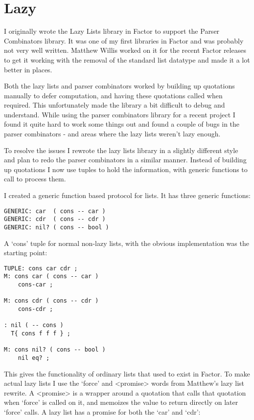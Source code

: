 \chapter{Lazy}\label{lazy}

I originally wrote the Lazy Lists library in Factor to support the
Parser Combinators library. It was one of my first libraries in Factor
and was probably not very well written. Matthew Willis worked on it
for the recent Factor releases to get it working with the removal of
the standard list datatype and made it a lot better in places.

Both the lazy lists and parser combinators worked by building up
quotations manually to defer computation, and having these quotations
called when required. This unfortunately made the library a bit
difficult to debug and understand. While using the parser combinators
library for a recent project I found it quite hard to work some things
out and found a couple of bugs in the parser combinators - and areas
where the lazy lists weren't lazy enough.

To resolve the issues I rewrote the lazy lists library in a slightly
different style and plan to redo the parser combinators in a similar
manner. Instead of building up quotations I now use tuples to hold the
information, with generic functions to call to process them.

I created a generic function based protocol for lists. It has three
generic functions:

\begin{verbatim}
GENERIC: car  ( cons -- car )
GENERIC: cdr  ( cons -- cdr )
GENERIC: nil? ( cons -- bool )
\end{verbatim}


A `cons' tuple for normal non-lazy lists, with the obvious
implementation was the starting point:

\begin{verbatim}
TUPLE: cons car cdr ;
M: cons car ( cons -- car )
    cons-car ;    

M: cons cdr ( cons -- cdr )
    cons-cdr ;    

: nil ( -- cons )
  T{ cons f f f } ;

M: cons nil? ( cons -- bool )
    nil eq? ;
\end{verbatim}


This gives the functionality of ordinary lists that used to exist in Factor. To make actual lazy lists I use the `force' and <promise> words from Matthew's lazy list rewrite. A <promise> is a wrapper around a quotation that calls that quotation when `force' is called on it, and memoizes the value to return directly on later `force' calls. A lazy list has a promise for both the `car' and `cdr':

